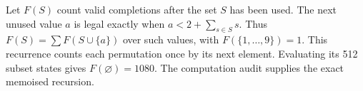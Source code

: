Let $F(S)$ count valid completions after the set $S$ has been used. The next unused value $a$ is legal exactly when $a<2+\sum_{s\in S}s$. Thus $F(S)=\sum F(S\cup\{a\})$ over such values, with $F(\{1,\ldots,9\})=1$. This recurrence counts each permutation once by its next element. Evaluating its 512 subset states gives $F(\varnothing)=\boxed{1080}$. The computation audit supplies the exact memoised recursion.

